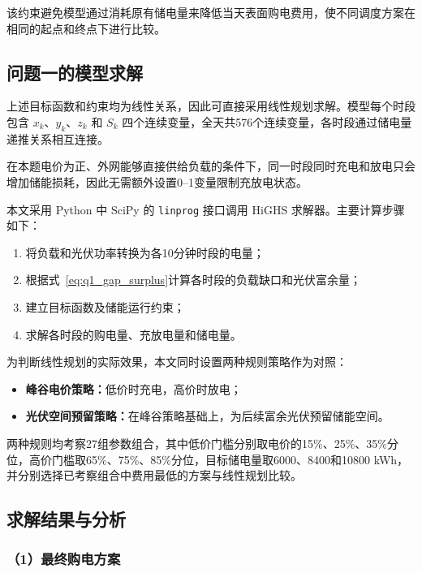 该约束避免模型通过消耗原有储电量来降低当天表面购电费用，使不同调度方案在相同的起点和终点下进行比较。

\subsection{问题一的模型求解}

上述目标函数和约束均为线性关系，因此可直接采用线性规划求解。模型每个时段包含 \(x_k\)、\(y_k\)、\(z_k\) 和 \(S_k\) 四个连续变量，全天共576个连续变量，各时段通过储电量递推关系相互连接。

在本题电价为正、外网能够直接供给负载的条件下，同一时段同时充电和放电只会增加储能损耗，因此无需额外设置0--1变量限制充放电状态。

本文采用 Python 中 SciPy 的 \texttt{linprog} 接口调用 HiGHS 求解器。主要计算步骤如下：

\begin{enumerate}
    \item 将负载和光伏功率转换为各10分钟时段的电量；
    \item 根据式~\eqref{eq:q1_gap_surplus}计算各时段的负载缺口和光伏富余量；
    \item 建立目标函数及储能运行约束；
    \item 求解各时段的购电量、充放电量和储电量。
\end{enumerate}

为判断线性规划的实际效果，本文同时设置两种规则策略作为对照：

\begin{itemize}
    \item \textbf{峰谷电价策略：}低价时充电，高价时放电；
    \item \textbf{光伏空间预留策略：}在峰谷策略基础上，为后续富余光伏预留储能空间。
\end{itemize}

两种规则均考察27组参数组合，其中低价门槛分别取电价的15\%、25\%、35\%分位，高价门槛取65\%、75\%、85\%分位，目标储电量取6000、8400和10800 kWh，并分别选择已考察组合中费用最低的方案与线性规划比较。

\subsection{求解结果与分析}

\subsubsection*{（1）最终购电方案}

